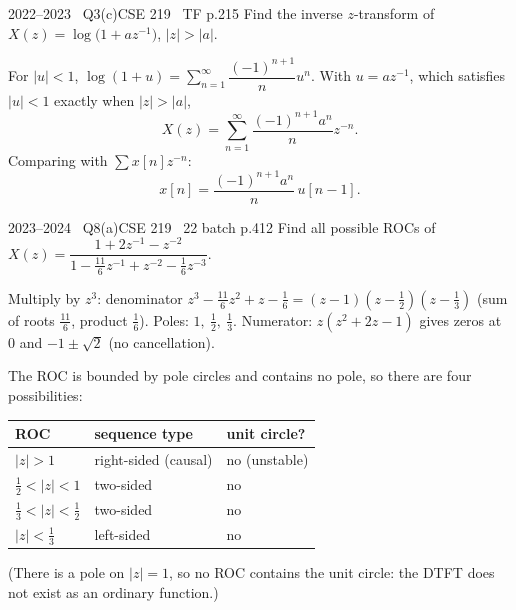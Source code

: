 \begin{qcard}{2022--2023 \textbullet\ Q3(c)}{CSE 219 \textbullet\ TF p.2}{15}
Find the inverse $z$-transform of $X(z)=\log\big(1+az^{-1}\big)$, $|z|>|a|$.
\end{qcard}
\begin{solution}
For $|u|<1$, $\log(1+u)=\sum_{n=1}^\infty\dfrac{(-1)^{n+1}}{n}u^n$. With $u=az^{-1}$, which satisfies $|u|<1$ exactly when $|z|>|a|$,
\[X(z)=\sum_{n=1}^\infty\frac{(-1)^{n+1}a^n}{n}z^{-n}.\]
Comparing with $\sum x[n]z^{-n}$:
\[x[n]=\frac{(-1)^{n+1}a^n}{n}\,u[n-1].\]
\end{solution}

\begin{qcard}{2023--2024 \textbullet\ Q8(a)}{CSE 219 \textbullet\ 22 batch p.4}{12}
Find all possible ROCs of $X(z)=\dfrac{1+2z^{-1}-z^{-2}}{1-\frac{11}6z^{-1}+z^{-2}-\frac16z^{-3}}$.
\end{qcard}
\begin{solution}
Multiply by $z^3$: denominator $z^3-\frac{11}6z^2+z-\frac16=(z-1)(z-\frac12)(z-\frac13)$ (sum of roots $\frac{11}6$, product $\frac16$). Poles: $1,\ \frac12,\ \frac13$. Numerator: $z(z^2+2z-1)$ gives zeros at $0$ and $-1\pm\sqrt2$ (no cancellation).

The ROC is bounded by pole circles and contains no pole, so there are four possibilities:
\begin{center}\small\renewcommand{\arraystretch}{1.2}\begin{tabular}{@{}lll@{}}\toprule ROC&sequence type&unit circle?\\\midrule
$|z|>1$&right-sided (causal)&no (unstable)\\
$\frac12<|z|<1$&two-sided&no\\
$\frac13<|z|<\frac12$&two-sided&no\\
$|z|<\frac13$&left-sided&no\\\bottomrule\end{tabular}\end{center}
(There is a pole on $|z|=1$, so no ROC contains the unit circle: the DTFT does not exist as an ordinary function.)
\end{solution}

